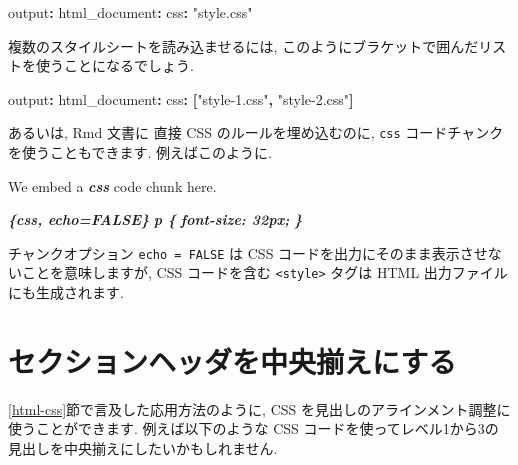 \documentclass[
  11pt,
]{bxjsreport}
\newenvironment{Shaded}{\begin{snugshade}}{\end{snugshade}}
\newcommand{\AttributeTok}[1]{\textcolor[rgb]{0.77,0.63,0.00}{#1}}
\newcommand{\FunctionTok}[1]{\textcolor[rgb]{0.00,0.00,0.00}{#1}}
\newcommand{\InformationTok}[1]{\textcolor[rgb]{0.56,0.35,0.01}{\textbf{\textit{#1}}}}
\newcommand{\KeywordTok}[1]{\textcolor[rgb]{0.13,0.29,0.53}{\textbf{#1}}}
\newcommand{\NormalTok}[1]{#1}
\newcommand{\StringTok}[1]{\textcolor[rgb]{0.31,0.60,0.02}{#1}}
\begin{document}
\begin{Shaded}
\begin{Highlighting}[]
\FunctionTok{output}\KeywordTok{:}
\AttributeTok{  }\FunctionTok{html\_document}\KeywordTok{:}
\AttributeTok{    }\FunctionTok{css}\KeywordTok{:}\AttributeTok{ }\StringTok{"style.css"}
\end{Highlighting}
\end{Shaded}

複数のスタイルシートを読み込ませるには, このようにブラケットで囲んだリストを使うことになるでしょう.

\begin{Shaded}
\begin{Highlighting}[]
\FunctionTok{output}\KeywordTok{:}
\AttributeTok{  }\FunctionTok{html\_document}\KeywordTok{:}
\AttributeTok{    }\FunctionTok{css}\KeywordTok{:}\AttributeTok{ }\KeywordTok{[}\StringTok{"style{-}1.css"}\KeywordTok{,}\AttributeTok{ }\StringTok{"style{-}2.css"}\KeywordTok{]}
\end{Highlighting}
\end{Shaded}

あるいは, Rmd 文書に 直接 CSS のルールを埋め込むのに, \texttt{css} コードチャンク を使うこともできます. 例えばこのように.

\begin{Shaded}
\begin{Highlighting}[]
\NormalTok{We embed a }\InformationTok{\textasciigrave{}css\textasciigrave{}}\NormalTok{ code chunk here.}

\InformationTok{\textasciigrave{}\textasciigrave{}\textasciigrave{}\{css, echo=FALSE\}}
\InformationTok{p \{}
\InformationTok{  font{-}size: 32px;}
\InformationTok{\}}
\InformationTok{\textasciigrave{}\textasciigrave{}\textasciigrave{}}
\end{Highlighting}
\end{Shaded}

チャンクオプション \texttt{echo = FALSE} は CSS コードを出力にそのまま表示させないことを意味しますが, CSS コードを含む \texttt{\textless{}style\textgreater{}} タグは HTML 出力ファイルにも生成されます.

\hypertarget{center-heading}{%
\section{セクションヘッダを中央揃えにする}\label{center-heading}}

\ref{html-css}節で言及した応用方法のように, CSS を見出しのアラインメント調整に使うことができます. 例えば以下のような CSS コードを使ってレベル1から3の見出しを中央揃えにしたいかもしれません.
\end{document}
